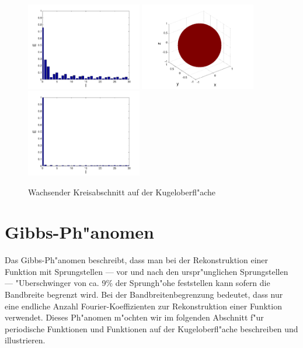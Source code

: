 \begin{refsection}
\begin{figure}
\includegraphics[width=0.45\textwidth]{kugel/Dkonstant/Kugel3_2.pdf}
\includegraphics[width=0.45\textwidth]{kugel/Dkonstant/Kugel4_1.pdf}
\includegraphics[width=0.45\textwidth]{kugel/Dkonstant/Kugel4_2.pdf}
\caption{Wachsender Kreisabschnitt auf der Kugeloberfl"ache
\label{skript:Dirac2}}
\end{figure}

\section{Gibbs-Ph"anomen}
Das Gibbs-Ph"anomen beschreibt, dass man bei der Rekonstruktion einer
Funktion mit Sprungstellen --- vor und nach den urspr"unglichen 
Sprungstellen --- "Uberschwinger von ca. 9\% der Sprungh"ohe feststellen 
kann sofern die Bandbreite begrenzt wird. 
Bei der Bandbreitenbegrenzung bedeutet, dass nur eine endliche Anzahl 
Fourier-Koeffizienten zur Rekonstruktion einer Funktion verwendet. 
Dieses Ph"anomen m"ochten wir im folgenden Abschnitt f"ur periodische 
Funktionen und Funktionen auf der Kugeloberfl"ache beschreiben und 
illustrieren.


\end{refsection}
